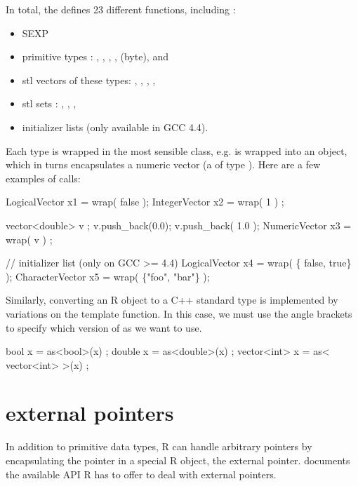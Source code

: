 In total, the  defines 23 different  
functions, including :
\begin{itemize}
\item SEXP
\item primitive types : , , , 
,  (byte),  and
\item stl vectors of these types: ,
, , , 
\item stl sets : , , , 
\item initializer lists (only available in GCC 4.4).
\end{itemize}

Each type is wrapped in the most sensible class, e.g. 
is wrapped into an  object, which in turns encapsulates
a numeric vector (a  of type ). 
Here are a few examples of  calls: 

\begin{example}
LogicalVector x1 = wrap( false ); 
IntegerVector x2 = wrap( 1 ) ;    

vector<double> v ; 
v.push_back(0.0); v.push_back( 1.0 ); 
NumericVector x3 = wrap( v ) ;  

// initializer list (only on GCC >= 4.4)
LogicalVector x4 = wrap( \{ false, true\} );
CharacterVector x5 = wrap( \{"foo", "bar"\} );
\end{example}

Similarly, converting an R object to a C++ standard type is implemented
by variations on the  template function. In this case, we must 
use the angle brackets to specify which version of as we want to use. 

\begin{example}
bool x = as<bool>(x) ;
double x = as<double>(x) ;
vector<int> x = as< vector<int> >(x) ;
\end{example}

\section{external pointers}

In addition to primitive data types, R can handle arbitrary pointers
by encapsulating the pointer in a special R object, the external 
pointer. \cite{R:exts} documents the available API R has to offer to 
deal with external pointers. 

